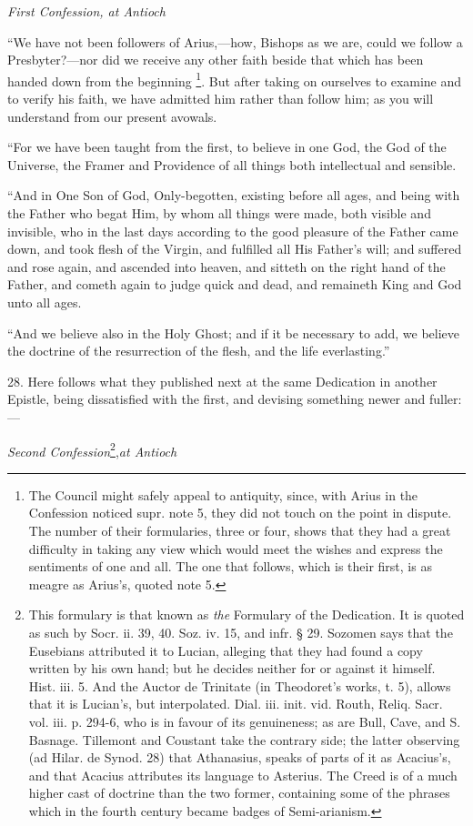 \emph{First
Confession, at Antioch}

``We have not been followers of
Arius,—how, Bishops as we are, could we follow a Presbyter?—nor
did we receive any other faith beside that which has been handed down
from the beginning \footnote{The Council might safely appeal to antiquity, since, with Arius in the
Confession noticed supr. note 5, they did not touch on the point in
dispute. The number of their formularies, three or four, shows that
they had a great difficulty in taking any view which would meet the
wishes and express the sentiments of one and all. The one that
follows, which is their first, is as meagre as Arius's, quoted note 5.}. But
after taking on ourselves to examine and to verify his faith, we have
admitted him rather than follow him; as you will understand from our
present avowals.

``For we have been taught from
the first, to believe in one God, the God of the Universe, the Framer
and Providence of all things both intellectual and sensible.

``And in One Son of God,
Only-begotten, existing before all ages, and being with the Father who
begat Him, by whom all things were made, both visible and invisible,
who in the last days according to the good pleasure of the Father came
down, and took flesh of the Virgin, and fulfilled all His Father's
will; and suffered and rose again, and ascended into heaven, and
sitteth on the right hand of the Father, and cometh again to judge
quick and dead, and remaineth King and God unto all ages.

``And we believe also in the
Holy Ghost; and if it be necessary to add, we believe the doctrine of
the resurrection of the flesh, and the life everlasting.''

28. Here follows what they
published next at the same Dedication in another Epistle, being
dissatisfied with the first, and devising something newer and
fuller:—

\emph{Second
Confession}\footnote{This formulary is that known as \emph{the} Formulary of the
Dedication. It is quoted as such by Socr. ii. 39, 40. Soz. iv. 15, and
infr. § 29. Sozomen says that the Eusebians attributed it to Lucian,
alleging that they had found a copy written by his own hand; but he
decides neither for or against it himself. Hist. iii. 5. And the
Auctor de Trinitate (in Theodoret's works, t. 5), allows that it is
Lucian's, but interpolated. Dial. iii. init. vid. Routh, Reliq. Sacr.
vol. iii. p. 294-6, who is in favour of its genuineness; as are Bull,
Cave, and S. Basnage. Tillemont and Coustant take the contrary side;
the latter observing (ad Hilar. de Synod. 28) that Athanasius, speaks
of parts of it as Acacius's, and that Acacius attributes its language
to Asterius. The Creed is of a much higher cast of doctrine than the
two former, containing some of the phrases which in the fourth century
became badges of Semi-arianism.},\emph{at Antioch}

